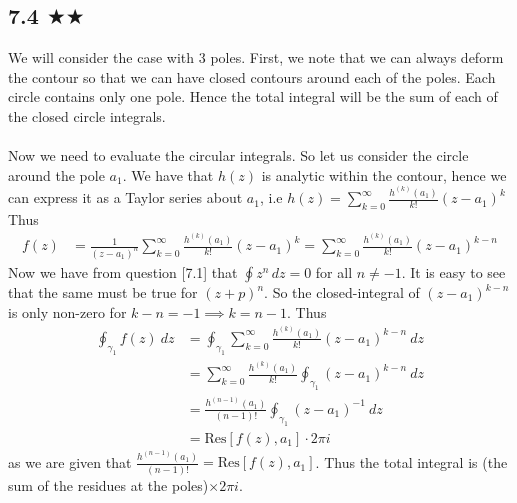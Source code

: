 \subsection{7.4 $\bigstar\bigstar$}
We will consider the case with 3 poles. First, we note that we can always deform the contour so that we can have closed contours around each of the poles. Each circle contains only one pole. Hence the total integral will be the sum of each of the closed circle integrals.\\ \\
Now we need to evaluate the circular integrals. So let us consider the circle around the pole $a_1$. We have that $h(z)$ is analytic within the contour, hence we can express it as a Taylor series about $a_1$, i.e  $h(z)=\sum_{k=0}^{\infty}\frac{h^{(k)}(a_1)}{k!}(z-a_1)^k$
Thus 
\begin{align*}
f(z)&=\frac{1}{(z-a_1)^n}\sum_{k=0}^{\infty}\frac{h^{(k)}(a_1)}{k!}(z-a_1)^k=\sum_{k=0}^{\infty}\frac{h^{(k)}(a_1)}{k!}(z-a_1)^{k-n}
\end{align*}
Now we have from question [7.1] that $\oint z^n\, dz=0$ for all $n\neq -1$. It is easy to see that the same must be true for $(z+p)^n$. So the closed-integral of $(z-a_1)^{k-n}$ is only non-zero for $k-n=-1 \implies k=n-1$. Thus 
\begin{align*}
\oint_{\gamma_1} f(z)\ dz&=\oint_{\gamma_1} \sum_{k=0}^{\infty}\frac{h^{(k)}(a_1)}{k!}(z-a_1)^{k-n}\ dz\\
&=\sum_{k=0}^{\infty}\frac{h^{(k)}(a_1)}{k!}\oint_{\gamma_1} (z-a_1)^{k-n}\ dz\\
&=\frac{h^{(n-1)}(a_1)}{(n-1)!}\oint_{\gamma_1} (z-a_1)^{-1}\ dz\\
&=\text{Res}[f(z),a_1]\cdot 2\pi i
\end{align*}
as we are given that $\frac{h^{(n-1)}(a_1)}{(n-1)!}=\text{Res}[f(z),a_1]$. Thus the total integral is (the sum of the residues at the poles)$\times 2\pi i$.


